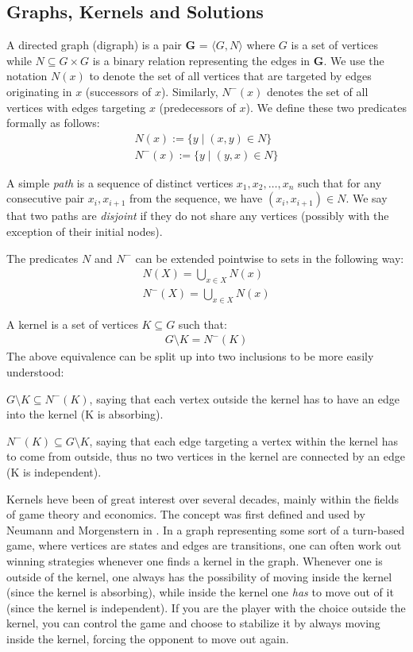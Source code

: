 \subsection{Graphs, Kernels and Solutions}
\label{sub:Graphs, Kernels and Solution}
A directed graph (digraph) is a pair \textbf{G} = $\langle G,N \rangle$ where $G$ is a set of vertices while $N \subseteq G \times G$ is a binary relation representing the edges in \textbf{G}.
We use the notation $N(x)$ to denote the set of all vertices that are targeted by edges originating in $x$ (successors of $x$).
Similarly, $N^-(x)$ denotes the set of all vertices with edges targeting $x$ (predecessors of $x$).
We define these two predicates formally as follows:
\begin{align}
  N(x) := \{y \;|\; (x,y) \in N\}\\
  N^-(x) := \{ y \;|\; (y,x) \in N \}
\end{align}

A simple \textit{path} is a sequence of distinct vertices $x_1,x_2,\dots,x_n$ such that for any consecutive pair $x_i,x_{i+1}$ from the sequence, we have $(x_i, x_{i+1}) \in N$.
We say that two paths are \textit{disjoint} if they do not share any vertices (possibly with the exception of their initial nodes).

The predicates $N$ and $N^-$ can be extended pointwise to sets in the following way:
\begin{align}
  N(X) = \bigcup_{x \in X} N(x)\\
  N^-(X) = \bigcup_{x \in X} N(x)
\end{align}

A kernel is a set of vertices $K \subseteq G$ such that:
\begin{align}
  G \setminus K = N^-(K)
\end{align}
The above equivalence can be split up into two inclusions to be more easily understood:

$G \setminus K \subseteq N^-(K)$, saying that each vertex outside the kernel has to have an edge into the kernel (K is absorbing).

$N^-(K) \subseteq G \setminus K$, saying that each edge targeting a vertex within the kernel has to come from outside, thus no two vertices in the kernel are connected by an edge (K is independent).

Kernels heve been of great interest over several decades, mainly within the fields of game theory and economics.
The concept was first defined and used by Neumann and Morgenstern in \cite{neumann}.
In a graph representing some sort of a turn-based game, where vertices are states and edges are transitions, one can often work out winning strategies whenever one finds a kernel in the graph.
Whenever one is outside of the kernel, one always has the possibility of moving inside the kernel (since the kernel is absorbing), while inside the kernel one \textit{has} to move out of it (since the kernel is independent).
If you are the player with the choice outside the kernel, you can control the game and choose to stabilize it by always moving inside the kernel, forcing the opponent to move out again.

